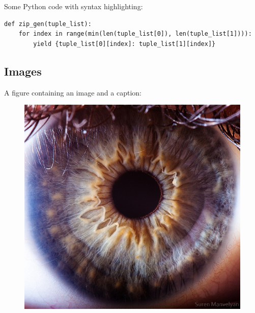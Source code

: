 Some Python code with syntax highlighting:
\begin{verbatim}
def zip_gen(tuple_list):
    for index in range(min(len(tuple_list[0]), len(tuple_list[1]))):
        yield {tuple_list[0][index]: tuple_list[1][index]}
\end{verbatim}

\subsection{Images}

A figure containing an image and a caption:
\begin{figure}[H]
	\includegraphics[width=0.8\linewidth]{eye.png}
	\label{fig:human-eye}
\end{figure}

